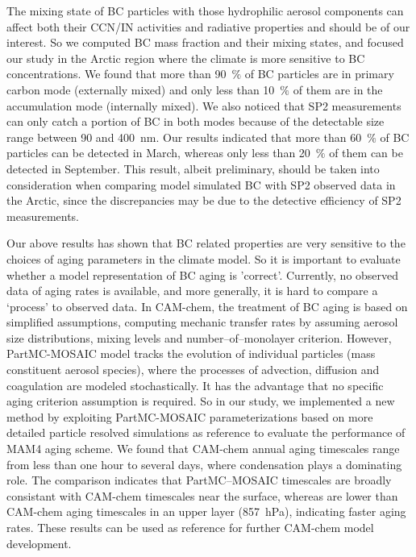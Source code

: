 \documentclass[12pt, fullpage]{uiucthesis2009}
\begin{document}
		The mixing state of BC particles with those hydrophilic aerosol components can affect both their CCN/IN activities and radiative properties and should be of our interest. So we computed BC mass fraction and their mixing states, and focused our study in the Arctic region where the climate is more sensitive to BC concentrations. We found that more than 90~$\%$ of BC particles are in primary carbon mode (externally mixed) and only less than 10~$\%$ of them are in the accumulation mode (internally mixed). We also noticed that SP2 measurements can only catch a portion of BC in both modes because of the detectable size range between 90 and 400~nm. Our results indicated that more than 60~$\%$ of BC particles can be detected in March, whereas only less than 20~$\%$ of them can be detected in September. This result, albeit preliminary, should be taken into consideration when comparing model simulated BC with SP2 observed data in the Arctic, since the discrepancies may be due to the detective efficiency of SP2 measurements. 
 
		Our above results has shown that BC related properties are very sensitive to the choices of aging parameters in the climate model. So it is important to evaluate whether a model representation of BC aging is 'correct'. Currently, no observed data of aging rates is available, and more generally, it is hard to compare a ‘process’ to observed data. In CAM-chem, the treatment of BC aging is based on simplified assumptions, computing mechanic transfer rates by assuming aerosol size distributions, mixing levels and number--of--monolayer criterion. However, PartMC-MOSAIC model tracks the evolution of individual particles (mass constituent aerosol species), where the processes of advection, diffusion and coagulation are modeled stochastically. It has the advantage that no specific aging criterion assumption is required. So in our study, we implemented a new method by exploiting PartMC-MOSAIC parameterizations based on more detailed particle resolved simulations as reference to evaluate the performance of MAM4 aging scheme. We found that CAM-chem annual aging timescales range from less than one hour to several days, where condensation plays a dominating role. The comparison indicates that PartMC--MOSAIC timescales are broadly consistant with CAM-chem timescales near the surface, whereas are lower than CAM-chem aging timescales in an upper layer (857~hPa), indicating faster aging rates. These results can be used as reference for further CAM-chem model development.
		
\end{document}
